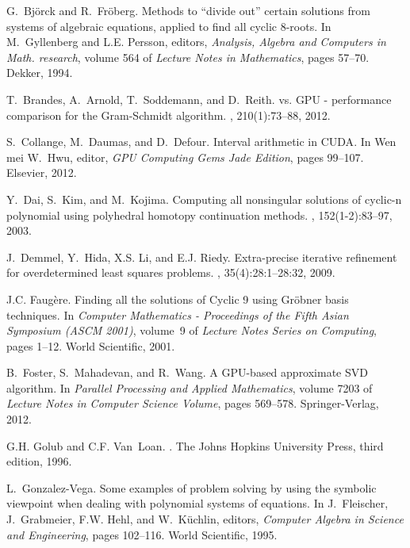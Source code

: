 \documentclass{article}
\begin{document}
\begin{thebibliography}{10}
G.~Bj\"{o}rck and R.~Fr\"{o}berg.
\newblock Methods to ``divide out'' certain solutions from systems of algebraic
  equations, applied to find all cyclic 8-roots.
\newblock In M.~Gyllenberg and L.E. Persson, editors, {\em Analysis, Algebra
  and Computers in Math. research}, volume 564 of {\em Lecture Notes in
  Mathematics}, pages 57--70. Dekker, 1994.

T.~Brandes, A.~Arnold, T.~Soddemann, and D.~Reith.
 vs. {GPU} - performance comparison for the {G}ram-{S}chmidt
  algorithm.
, 210(1):73--88,
  2012.

S.~Collange, M.~Daumas, and D.~Defour.
\newblock Interval arithmetic in {CUDA}.
\newblock In Wen mei W.~Hwu, editor, {\em GPU Computing Gems Jade Edition},
  pages 99--107. Elsevier, 2012.

Y.~Dai, S.~Kim, and M.~Kojima.
\newblock Computing all nonsingular solutions of cyclic-n polynomial using
  polyhedral homotopy continuation methods.
, 152(1-2):83--97, 2003.

J.~Demmel, Y.~Hida, X.S. Li, and E.J. Riedy.
\newblock Extra-precise iterative refinement for overdetermined least squares
  problems.
, 35(4):28:1--28:32, 2009.

J.C. Faug\`ere.
\newblock Finding all the solutions of {C}yclic 9 using {G}r{\"{o}}bner basis
  techniques.
\newblock In {\em Computer Mathematics - Proceedings of the Fifth Asian
  Symposium (ASCM 2001)}, volume~9 of {\em Lecture Notes Series on Computing},
  pages 1--12. World Scientific, 2001.

B.~Foster, S.~Mahadevan, and R.~Wang.
\newblock A {GPU}-based approximate {SVD} algorithm.
\newblock In {\em Parallel Processing and Applied Mathematics}, volume 7203 of
  {\em Lecture Notes in Computer Science Volume}, pages 569--578.
  Springer-Verlag, 2012.

G.H. Golub and C.F. Van~Loan.
.
\newblock The Johns Hopkins University Press, third edition, 1996.

L.~Gonzalez-Vega.
\newblock Some examples of problem solving by using the symbolic viewpoint when
  dealing with polynomial systems of equations.
\newblock In J.~Fleischer, J.~Grabmeier, F.W. Hehl, and W.~K{\"{u}}chlin,
  editors, {\em Computer Algebra in Science and Engineering}, pages 102--116.
  World Scientific, 1995.


\end{thebibliography}
\end{document}
